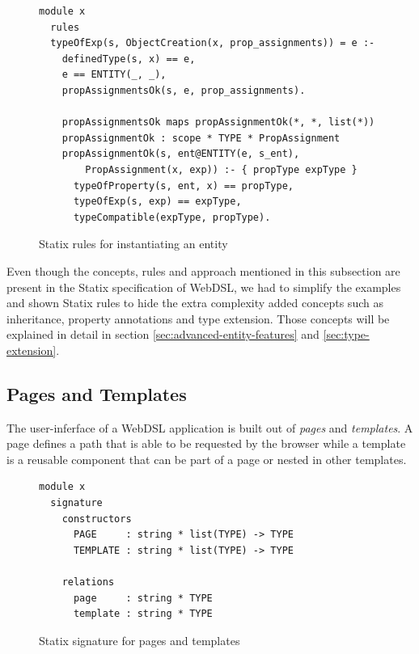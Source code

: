       \begin{figure}
        \begin{verbatim}
module x
  rules
  typeOfExp(s, ObjectCreation(x, prop_assignments)) = e :-
    definedType(s, x) == e,
    e == ENTITY(_, _),
    propAssignmentsOk(s, e, prop_assignments).

    propAssignmentsOk maps propAssignmentOk(*, *, list(*))
    propAssignmentOk : scope * TYPE * PropAssignment
    propAssignmentOk(s, ent@ENTITY(e, s_ent),
        PropAssignment(x, exp)) :- { propType expType }
      typeOfProperty(s, ent, x) == propType,
      typeOfExp(s, exp) == expType,
      typeCompatible(expType, propType).
        \end{verbatim}
        \caption{\label{fig:webdsl-entity-instantiation}Statix rules for instantiating an entity}
      \end{figure}

      Even though the concepts, rules and approach mentioned in this subsection are present in the Statix specification of WebDSL, we had to simplify the examples and shown Statix rules to hide the extra complexity added concepts such as inheritance, property annotations and type extension. Those concepts will be explained in detail in section \cref{sec:advanced-entity-features} and \cref{sec:type-extension}.

    \subsection{\label{subsec:simple-pages}Pages and Templates}

      The user-inferface of a WebDSL application is built out of \textit{pages} and \textit{templates}. A page defines a path that is able to be requested by the browser while a template is a reusable component that can be part of a page or nested in other templates.

      \begin{figure}
        \begin{verbatim}
module x
  signature
    constructors
      PAGE     : string * list(TYPE) -> TYPE
      TEMPLATE : string * list(TYPE) -> TYPE

    relations
      page     : string * TYPE
      template : string * TYPE
        \end{verbatim}
        \caption{\label{fig:statix-page-and-template-constructors}Statix signature for pages and templates}
      \end{figure}

